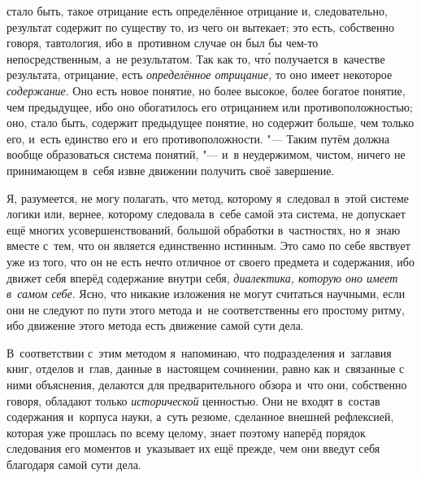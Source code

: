 стало быть, такое отрицание есть определённое отрицание и, следовательно,
результат содержит по существу то, из чего он вытекает; это есть, собственно
говоря, тавтология, ибо в~противном случае он был бы чем-то непосредственным,
а~не результатом. Так как то, чт\'{о} получается в~качестве результата,
отрицание, есть {\em определённое отрицание,}
то оно имеет некоторое {\em содержание}. Оно есть новое
понятие, но более высокое, более богатое понятие, чем предыдущее, ибо оно
обогатилось его отрицанием или противоположностью; оно, стало быть,
содержит предыдущее понятие, но содержит больше, чем только его,
и~есть единство его и~его противоположности. "--- Таким путём должна
вообще образоваться система понятий, "--- и~в неудержимом, чистом, ничего не
принимающем в~себя извне движении получить своё завершение.

Я, разумеется, не могу полагать, что метод, которому я~следовал в~этой
системе логики или, вернее, которому следовала в~себе самой эта система, не
допускает ещё многих усовершенствований, большой обработки в~частностях, но
я~знаю вместе с~тем, что он является единственно истинным. Это само по себе
явствует уже из того, что он не есть нечто отличное от своего предмета и
содержания, ибо движет себя вперёд содержание внутри себя,
{\em диалектика, которую оно имеет в~самом себе}. Ясно,
что никакие изложения не могут считаться научными, если они не следуют по
пути этого метода и~не соответственны его простому ритму, ибо движение
этого метода есть движение самой сути дела.

В~соответствии с~этим методом я~напоминаю, что подразделения и~заглавия
книг, отделов и~глав, данные в~настоящем сочинении, равно как и~связанные с
ними объяснения, делаются для предварительного обзора и~что они, собственно
говоря, обладают только {\em исторической} ценностью.
Они не входят в~состав содержания и~корпуса науки, а~суть резюме, сделанное
внешней рефлексией, которая уже прошлась по всему целому, знает поэтому
наперёд порядок следования его моментов и~указывает их ещё прежде, чем они
введут себя благодаря самой сути дела.

